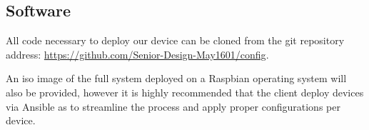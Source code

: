\subsection{Software}
All code necessary to deploy our device can be cloned from the git repository address: \url{https://github.com/Senior-Design-May1601/config}.

An iso image of the full system deployed on a Raspbian operating system will also be provided, however it is highly recommended that the client deploy devices via Ansible as to streamline the process and apply proper configurations per device.
